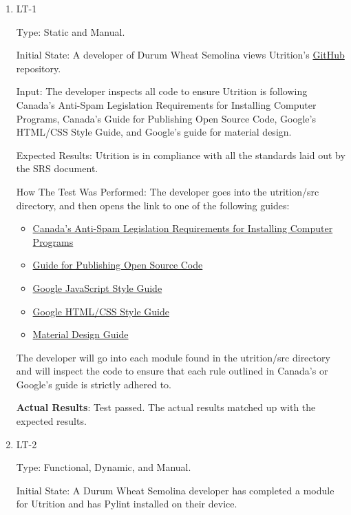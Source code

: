\documentclass[12pt, titlepage]{article}
\begin{document}
	\begin{enumerate}
		\item{LT-1}
		
		Type: Static and Manual.
		
		Initial State: A developer of Durum Wheat Semolina views Utrition’s \href{https://github.com/jeff-rey-wang/utrition/}{GitHub} repository.
		
		Input: The developer inspects all code to ensure Utrition is following Canada’s Anti-Spam Legislation Requirements for Installing Computer Programs, Canada’s Guide for Publishing Open Source Code, Google’s HTML/CSS Style Guide, and Google’s guide for material design.
		
		Expected Results: Utrition is in compliance with all the standards laid out by the SRS document.
		
		How The Test Was Performed: The developer goes into the utrition/src directory, and then opens the link to one of the following guides:
		\begin{itemize}
			\item \href{https://crtc.gc.ca/eng/internet/install.htm}{Canada’s Anti-Spam Legislation Requirements for Installing Computer Programs}
			\item \href{https://www.canada.ca/en/government/system/digital-government/digital-government-innovations/open-source-software/guide-for-publishing-open-source-code.html}{Guide for Publishing Open Source Code}
			\item \href{https://google.github.io/styleguide/jsguide.html}{Google JavaScript Style Guide}
			\item \href{https://google.github.io/styleguide/htmlcssguide.html}{Google HTML/CSS Style Guide}
			\item \href{https://material.io/design}{Material Design Guide}
		\end{itemize}
		The developer will go into each module found in the utrition/src directory and will inspect the code to ensure that each rule outlined in Canada’s or Google’s guide is strictly adhered to.
		
		\textbf{Actual Results}: Test passed. The actual results matched up with the expected results.
		
		\item{LT-2}
		
		Type: Functional, Dynamic, and Manual.
		
		Initial State: A Durum Wheat Semolina developer has completed a module for Utrition and has Pylint installed on their device.
		

\end{enumerate}
\end{document}
